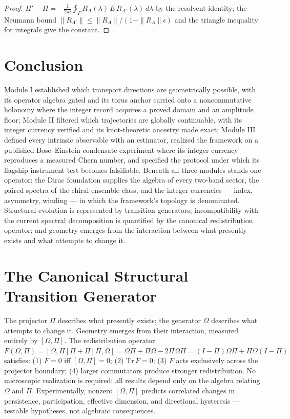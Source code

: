 \documentclass[11pt]{article}
\theoremstyle{definition}
\theoremstyle{plain}
\begin{document}
\begin{proof}
$\Pi' - \Pi = -\tfrac{1}{2\pi i}\oint_\Gamma R_A(\lambda)\,E\,R_{A'}(\lambda)\,
d\lambda$ by the resolvent identity; the Neumann bound
$\|R_{A'}\| \le \|R_A\|/(1 - \|R_A\|\epsilon)$ and the triangle inequality for
integrals give the constant.
\end{proof}

\section{Conclusion}

Module I established which transport directions are geometrically possible, with
its operator algebra gated and its torus anchor carried onto a noncommutative
holonomy where the integer record acquires a proved domain and an amplitude floor;
Module II filtered which trajectories are globally continuable, with its integer
currency verified and its knot-theoretic ancestry made exact; Module III defined
every intrinsic observable with an estimator, realized the framework on a published
Bose--Einstein-condensate experiment where its integer currency reproduces a
measured Chern number, and specified the protocol under which its flagship
instrument test becomes falsifiable. Beneath all three modules stands one operator:
the Dirac foundation supplies the algebra of every two-band sector, the paired
spectra of the chiral ensemble class, and the integer currencies --- index,
asymmetry, winding --- in which the framework's topology is denominated. Structural
evolution is represented by transition generators; incompatibility with the current
spectral decomposition is quantified by the canonical redistribution operator; and
geometry emerges from the interaction between what presently exists and what
attempts to change it.

\appendix

\section{The Canonical Structural Transition Generator}

The projector $\Pi$ describes what presently exists; the generator $\Omega$
describes what attempts to change it. Geometry emerges from their interaction,
measured entirely by $[\Omega,\Pi]$. The redistribution operator
$F(\Omega,\Pi) = [\Omega,\Pi]\Pi + \Pi[\Pi,\Omega] = \Omega\Pi + \Pi\Omega -
2\Pi\Omega\Pi = (I-\Pi)\Omega\Pi + \Pi\Omega(I-\Pi)$ satisfies: (1) $F = 0$ iff
$[\Omega,\Pi] = 0$; (2) $\mathrm{Tr}\,F = 0$; (3) $F$ acts exclusively across the
projector boundary; (4) larger commutators produce stronger redistribution. No
microscopic realization is required: all results depend only on the algebra
relating $\Omega$ and $\Pi$. Experimentally, nonzero $[\Omega,\Pi]$ predicts
correlated changes in persistence, participation, effective dimension, and
directional hysteresis --- testable hypotheses, not algebraic consequences.
\end{document}
